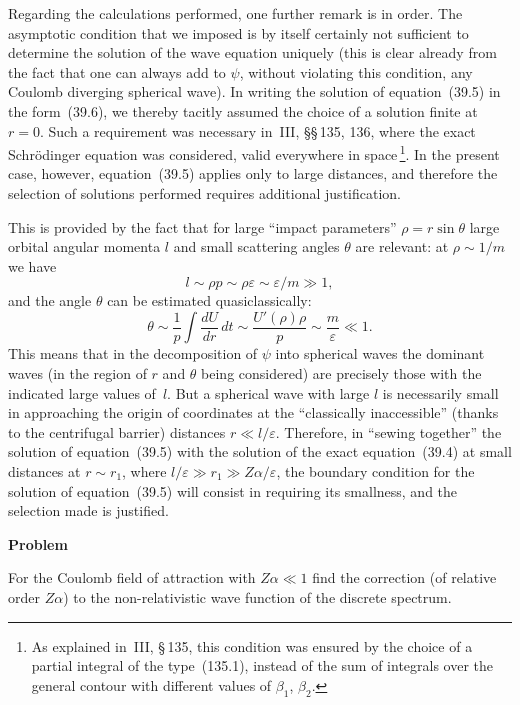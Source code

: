 Regarding the calculations performed, one further remark is in order. The asymptotic condition that we imposed is by itself certainly not sufficient to determine the solution of the wave equation uniquely (this is clear already from the fact that one can always add to $\psi$, without violating this condition, any Coulomb diverging spherical wave). In writing the solution of equation~(39.5) in the form~(39.6), we thereby tacitly assumed the choice of a solution finite at $r = 0$. Such a requirement was necessary in~III, \S\S\,135, 136, where the exact Schr\"odinger equation was considered, valid everywhere in space\,\footnote{As explained in~III, \S\,135, this condition was ensured by the choice of a partial integral of the type~(135.1), instead of the sum of integrals over the general contour with different values of $\beta_1$, $\beta_2$.}. In the present case, however, equation~(39.5) applies only to large distances, and therefore the selection of solutions performed requires additional justification.

This is provided by the fact that for large ``impact parameters'' $\rho = r\sin\theta$ large orbital angular momenta $l$ and small scattering angles $\theta$ are relevant: at $\rho \sim 1/m$ we have
\[
l \sim \rho p \sim \rho\varepsilon \sim \varepsilon/m \gg 1,
\]
and the angle $\theta$ can be estimated quasiclassically:
\[
\theta \sim \frac{1}{p}\int\!\frac{dU}{dr}\,dt \sim \frac{U'(\rho)\rho}{p} \sim \frac{m}{\varepsilon} \ll 1.
\]
This means that in the decomposition of $\psi$ into spherical waves the dominant waves (in the region of $r$ and $\theta$ being considered) are precisely those with the indicated large values of~$l$. But a spherical wave with large $l$ is necessarily small in approaching the origin of coordinates at the ``classically inaccessible'' (thanks to the centrifugal barrier) distances $r \ll l/\varepsilon$. Therefore, in ``sewing together'' the solution of equation~(39.5) with the solution of the exact equation~(39.4) at small distances at $r \sim r_1$, where $l/\varepsilon \gg r_1 \gg Z\alpha/\varepsilon$, the boundary condition for the solution of equation~(39.5) will consist in requiring its smallness, and the selection made is justified.

\begin{center}
\textbf{Problem}
\end{center}

For the Coulomb field of attraction with $Z\alpha \ll 1$ find the correction (of relative order $Z\alpha$) to the non-relativistic wave function of the discrete spectrum.

